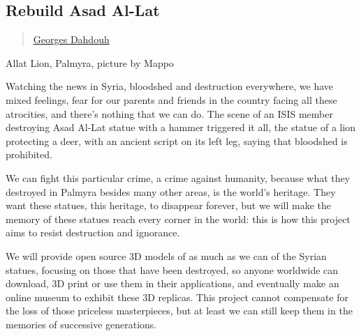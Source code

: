 \subsection{Rebuild Asad Al-Lat}\label{rebuild-asad-al-lat}

\begin{quote}
\href{../appendix/attributions.html\#georges-dahdouh}{Georges Dahdouh}
\end{quote}

Allat Lion, Palmyra, picture by Mappo

Watching the news in Syria, bloodshed and destruction everywhere, we
have mixed feelings, fear for our parents and friends in the country
facing all these atrocities, and there's nothing that we can do. The
scene of an ISIS member destroying Asad Al-Lat statue with a hammer
triggered it all, the statue of a lion protecting a deer, with an
ancient script on its left leg, saying that bloodshed is prohibited.

We can fight this particular crime, a crime against humanity, because
what they destroyed in Palmyra besides many other areas, is the world's
heritage. They want these statues, this heritage, to disappear forever,
but we will make the memory of these statues reach every corner in the
world: this is how this project aims to resist destruction and
ignorance.

We will provide open source 3D models of as much as we can of the Syrian
statues, focusing on those that have been destroyed, so anyone worldwide
can download, 3D print or use them in their applications, and eventually
make an online museum to exhibit these 3D replicas. This project cannot
compensate for the loss of those priceless masterpieces, but at least we
can still keep them in the memories of successive generations.
